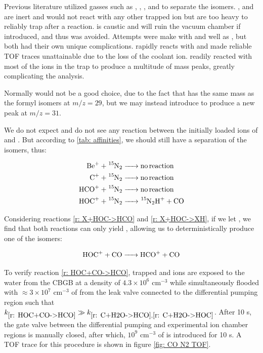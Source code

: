Previous literature utilized gasses such as , , , and  to separate the isomers. , and  are inert and would not react with any other trapped ion but are too heavy to reliably trap after a reaction.  is caustic and will ruin the vacuum chamber if introduced, and thus was avoided. Attempts were make with  and well as , but both had their own unique complications.  rapidly reacts with  and made reliable TOF traces unattainable due to the loss of the coolant ion.  readily reacted with most of the ions in the trap to produce a multitude of mass peaks, greatly complicating the analysis.

Normally  would not be a good choice, due to the fact that  has the same mass as the formyl isomers at $m/z=29$, but we may instead introduce  to produce a new peak at $m/z=31$.

We do not expect and do not see any reaction between the initially loaded ions of  and . But according to \cref{tab: affinities}, we should still have a separation of the isomers, thus:

\begin{align}
	\ce{Be+ + ^15N2 & -> no reaction} \\
	\ce{C+ + ^15N2 & -> no reaction} \\
	\ce{HCO+ + ^15N2 & -> no reaction} \label{r: HCO+N2->NA} \\
	\ce{HOC+ + ^15N2 & -> ^15N2H+ + CO} \label{r: HOC+N2->N2H}
\end{align}

Considering reactions \ref{r: X+HOC->HCO} and \ref{r: X+HOC->XH}, if we let , we find that both reactions can only yield , allowing us to deterministically produce one of the isomers:

\begin{equation}
	\ce{HOC+ + CO -> HCO+ + CO} \label{r: HOC+CO->HCO}
\end{equation}

To verify reaction \ref{r: HOC+CO->HCO}, trapped  and  ions are exposed to the water from the CBGB at a density of $4.3 \times 10^6$ cm$^{-3}$ while simultaneously flooded with $\approx 3 \times 10^7$ cm$^{-3}$ of  from the leak valve connected to the differential pumping region such that $k_{\ref{r: HOC+CO->HCO}} \gg k_{\ref{r: C+H2O->HCO}, \ref{r: C+H2O->HOC}}$. After 10 s, the gate valve between the differential pumping and experimental ion chamber regions is manually closed, after which, $10^9$ cm$^{-3}$ of  is introduced for 10 s. A TOF trace for this procedure is shown in figure \ref{fig: CO N2 TOF}.

